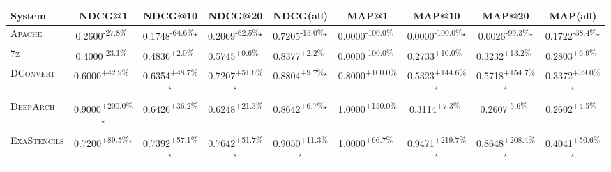 \begin{table}[htbp]
\centering
\renewcommand{\arraystretch}{1.2}
\begin{tabular}{l|cccc|cccc}
\hline
System & NDCG@1 & NDCG@10 & NDCG@20 & NDCG(all) & MAP@1 & MAP@10 & MAP@20 & MAP(all) \\ \hline
\textsc{Apache} & \cellcolor{red!30}0.2600\textsuperscript{-27.8\%}$^{\,\,\,}$ & \cellcolor{red!30}0.1748\textsuperscript{-64.6\%}$^\star$ & \cellcolor{red!30}0.2069\textsuperscript{-62.5\%}$^\star$ & \cellcolor{red!30}0.7205\textsuperscript{-13.0\%}$^\star$ & \cellcolor{red!30}0.0000\textsuperscript{-100.0\%}$^{\,\,\,}$ & \cellcolor{red!30}0.0000\textsuperscript{-100.0\%}$^\star$ & \cellcolor{red!30}0.0026\textsuperscript{-99.3\%}$^\star$ & \cellcolor{red!30}0.1722\textsuperscript{-38.4\%}$^\star$ \\
\textsc{7z} & \cellcolor{red!30}0.4000\textsuperscript{-23.1\%}$^{\,\,\,}$ & \cellcolor{green!30}0.4836\textsuperscript{+2.0\%}$^{\,\,\,}$ & \cellcolor{green!30}0.5745\textsuperscript{+9.6\%}$^{\,\,\,}$ & \cellcolor{green!30}0.8377\textsuperscript{+2.2\%}$^{\,\,\,}$ & \cellcolor{red!30}0.0000\textsuperscript{-100.0\%}$^{\,\,\,}$ & \cellcolor{green!30}0.2733\textsuperscript{+10.0\%}$^{\,\,\,}$ & \cellcolor{green!30}0.3232\textsuperscript{+13.2\%}$^{\,\,\,}$ & \cellcolor{green!30}0.2803\textsuperscript{+6.9\%}$^{\,\,\,}$ \\
\textsc{DConvert} & \cellcolor{green!30}0.6000\textsuperscript{+42.9\%}$^{\,\,\,}$ & \cellcolor{green!30}0.6354\textsuperscript{+48.7\%}$^\star$ & \cellcolor{green!30}0.7207\textsuperscript{+51.6\%}$^\star$ & \cellcolor{green!30}0.8804\textsuperscript{+9.7\%}$^\star$ & \cellcolor{green!30}0.8000\textsuperscript{+100.0\%}$^{\,\,\,}$ & \cellcolor{green!30}0.5323\textsuperscript{+144.6\%}$^\star$ & \cellcolor{green!30}0.5718\textsuperscript{+154.7\%}$^\star$ & \cellcolor{green!30}0.3372\textsuperscript{+39.0\%}$^\star$ \\
\textsc{DeepArch} & \cellcolor{green!30}0.9000\textsuperscript{+200.0\%}$^\star$ & \cellcolor{green!30}0.6426\textsuperscript{+36.2\%}$^{\,\,\,}$ & \cellcolor{green!30}0.6248\textsuperscript{+21.3\%}$^{\,\,\,}$ & \cellcolor{green!30}0.8642\textsuperscript{+6.7\%}$^\star$ & \cellcolor{green!30}1.0000\textsuperscript{+150.0\%}$^{\,\,\,}$ & \cellcolor{green!30}0.3114\textsuperscript{+7.3\%}$^{\,\,\,}$ & \cellcolor{red!30}0.2607\textsuperscript{-5.6\%}$^{\,\,\,}$ & \cellcolor{green!30}0.2602\textsuperscript{+4.5\%}$^{\,\,\,}$ \\
\textsc{ExaStencils} & \cellcolor{green!30}0.7200\textsuperscript{+89.5\%}$^\star$ & \cellcolor{green!30}0.7392\textsuperscript{+57.1\%}$^\star$ & \cellcolor{green!30}0.7642\textsuperscript{+51.7\%}$^\star$ & \cellcolor{green!30}0.9050\textsuperscript{+11.3\%}$^\star$ & \cellcolor{green!30}1.0000\textsuperscript{+66.7\%}$^{\,\,\,}$ & \cellcolor{green!30}0.9471\textsuperscript{+219.7\%}$^\star$ & \cellcolor{green!30}0.8648\textsuperscript{+208.4\%}$^\star$ & \cellcolor{green!30}0.4041\textsuperscript{+56.6\%}$^\star$ \\

\end{tabular}
\end{table}
